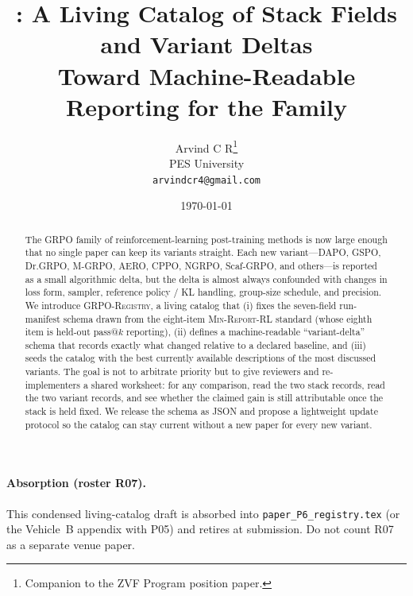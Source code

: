 \documentclass[11pt]{article}
\title{\grpoReg{}: A Living Catalog of Stack Fields and Variant Deltas\\
\large Toward Machine-Readable Reporting for the \grpo{} Family}
\author{Arvind C R\thanks{Companion to the ZVF Program \minreport{} position
paper.}\\PES University\\\texttt{arvindcr4@gmail.com}}
\date{\today}
\newcommand{\minreport}{\textsc{Min-Report-RL}}
\newcommand{\grpo}{\textsc{GRPO}}
\newcommand{\grpoReg}{\textsc{GRPO-Registry}}
\begin{document}
\maketitle

\paragraph{Absorption (roster R07).}
This condensed living-catalog draft is absorbed into
\texttt{paper\_P6\_registry.tex} (or the Vehicle~B appendix with P05) and retires
at submission. Do not count R07 as a separate venue paper.

\begin{abstract}
The \grpo{} family of reinforcement-learning post-training methods is now
large enough that no single paper can keep its variants straight. Each new
variant---DAPO, GSPO, Dr.\grpo{}, M-\grpo{}, AERO, CPPO, NGRPO,
Scaf-\grpo{}, and others---is reported as a small algorithmic delta, but the
delta is almost always confounded with changes in loss form, sampler, reference
policy / KL handling, group-size schedule, and precision. We introduce
\grpoReg{}, a living catalog that (i) fixes the seven-field run-manifest
schema drawn from the eight-item \minreport{} standard (whose eighth item is
held-out pass@$k$ reporting), (ii)
defines a machine-readable ``variant-delta'' schema that records exactly what
changed relative to a declared baseline, and (iii) seeds the catalog with the
best currently available descriptions of the most discussed variants. The goal
is not to arbitrate priority but to give reviewers and re-implementers a shared
worksheet: for any comparison, read the two stack records, read the two variant
records, and see whether the claimed gain is still attributable once the stack
is held fixed. We release the schema as JSON and propose a lightweight
update protocol so the catalog can stay current without a new paper for every
new variant.
\end{abstract}
\end{document}
